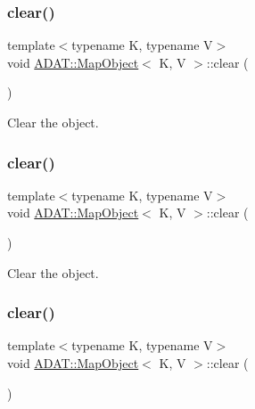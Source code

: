 \subsubsection{\texorpdfstring{clear()}{clear()}\hspace{0.1cm}{\footnotesize\ttfamily [1/3]}}
{\footnotesize\ttfamily template$<$typename K, typename V$>$ \\
void \mbox{\hyperlink{classADAT_1_1MapObject}{A\+D\+A\+T\+::\+Map\+Object}}$<$ K, V $>$\+::clear (\begin{DoxyParamCaption}{ }\end{DoxyParamCaption})\hspace{0.3cm}{\ttfamily [inline]}}



Clear the object. 

\mbox{\label{classADAT_1_1MapObject_ad4a8a70a7c12d4bdc488d6eac20388a1}} 
\subsubsection{\texorpdfstring{clear()}{clear()}\hspace{0.1cm}{\footnotesize\ttfamily [2/3]}}
{\footnotesize\ttfamily template$<$typename K, typename V$>$ \\
void \mbox{\hyperlink{classADAT_1_1MapObject}{A\+D\+A\+T\+::\+Map\+Object}}$<$ K, V $>$\+::clear (\begin{DoxyParamCaption}{ }\end{DoxyParamCaption})\hspace{0.3cm}{\ttfamily [inline]}}



Clear the object. 

\mbox{\label{classADAT_1_1MapObject_ad4a8a70a7c12d4bdc488d6eac20388a1}} 
\subsubsection{\texorpdfstring{clear()}{clear()}\hspace{0.1cm}{\footnotesize\ttfamily [3/3]}}
{\footnotesize\ttfamily template$<$typename K, typename V$>$ \\
void \mbox{\hyperlink{classADAT_1_1MapObject}{A\+D\+A\+T\+::\+Map\+Object}}$<$ K, V $>$\+::clear (\begin{DoxyParamCaption}{ }\end{DoxyParamCaption})\hspace{0.3cm}{\ttfamily [inline]}}



